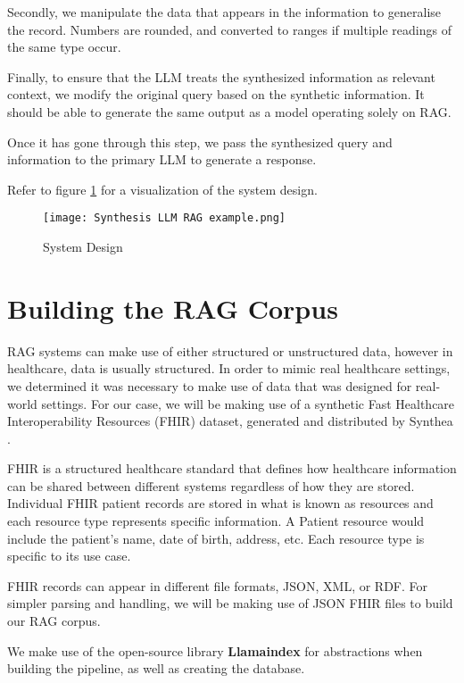 Secondly, we manipulate the data that appears in the information to generalise the record. Numbers are rounded, and converted to ranges if multiple readings of the same type occur.

Finally, to ensure that the LLM treats the synthesized information as relevant context, we modify the original query based on the synthetic information. It should be able to generate the same output as a model operating solely on RAG.

Once it has gone through this step, we pass the synthesized query and information to the primary LLM to generate a response.

Refer to figure \ref{fig:SynthLLMRAG} for a visualization of the system design.

\begin{figure}
	\texttt{[image: Synthesis LLM RAG example.png]}
	\caption{System Design}
	\centering
	\label{fig:SynthLLMRAG}
\end{figure}

\section{Building the RAG Corpus}
RAG systems can make use of either structured or unstructured data, however in healthcare, data is usually structured.
In order to mimic real healthcare settings, we determined it was necessary to make use of data that was designed for real-world settings.
For our case, we will be making use of a synthetic Fast Healthcare Interoperability Resources (FHIR) dataset, generated and distributed by Synthea \autocite{Synthea2024}.

FHIR is a structured healthcare standard that defines how healthcare information can be shared between different systems regardless of how they are stored.
Individual FHIR patient records are stored in what is known as resources and each resource type represents specific information. A Patient resource would include the patient's name, date of birth, address, etc. Each resource type is specific to its use case.

FHIR records can appear in different file formats, JSON, XML, or RDF. For simpler parsing and handling, we will be making use of JSON FHIR files to build our RAG corpus.

We make use of the open-source library \textbf{Llamaindex} \autocite{Liu_LlamaIndex_2022} for abstractions when building the pipeline, as well as creating the database.

